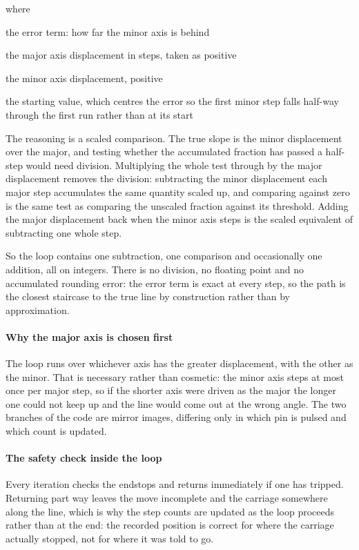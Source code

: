 \noindent where
\begin{description}[leftmargin=2.4em,style=nextline,font=\normalfont\ttfamily]\setlength\itemsep{1pt}
  \item[{$e$}] \normalfont the error term: how far the minor axis is behind
  \item[{$a_x$}] \normalfont the major axis displacement in steps, taken as positive
  \item[{$a_y$}] \normalfont the minor axis displacement, positive
  \item[{$\lfloor a_x/2 \rfloor$}] \normalfont the starting value, which centres the error so the first minor step falls half-way through the first run rather than at its start
\end{description}
The reasoning is a scaled comparison. The true slope is the minor displacement over the major, and testing whether the accumulated fraction has passed a half-step would need division. Multiplying the whole test through by the major displacement removes the division: subtracting the minor displacement each major step accumulates the same quantity scaled up, and comparing against zero is the same test as comparing the unscaled fraction against its threshold. Adding the major displacement back when the minor axis steps is the scaled equivalent of subtracting one whole step.

So the loop contains one subtraction, one comparison and occasionally one addition, all on integers. There is no division, no floating point and no accumulated rounding error: the error term is exact at every step, so the path is the closest staircase to the true line by construction rather than by approximation.


\paragraph{Why the major axis is chosen first}
The loop runs over whichever axis has the greater displacement, with the other as the minor. That is necessary rather than cosmetic: the minor axis steps at most once per major step, so if the shorter axis were driven as the major the longer one could not keep up and the line would come out at the wrong angle. The two branches of the code are mirror images, differing only in which pin is pulsed and which count is updated.


\paragraph{The safety check inside the loop}
Every iteration checks the endstops and returns immediately if one has tripped. Returning part way leaves the move incomplete and the carriage somewhere along the line, which is why the step counts are updated as the loop proceeds rather than at the end: the recorded position is correct for where the carriage actually stopped, not for where it was told to go.



